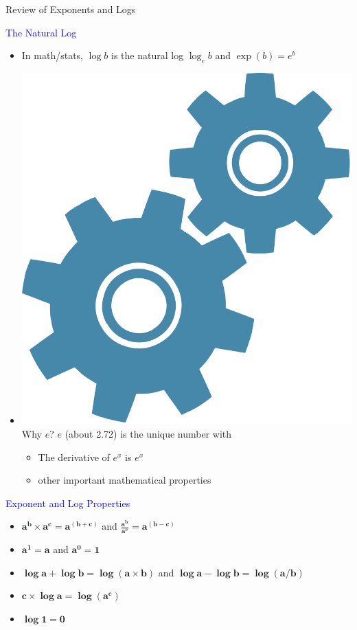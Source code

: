 \documentclass[10pt,t]{beamer}
\begin{document}
\begin{frame}{Review of Exponents and Logs}
	
	\vspace{-5 mm}
	
	\textcolor{blue}{The Natural Log}
	\begin{itemize}
		\item In math/stats, $\log b$ is the natural log $\log_e b$ and $\exp(b) = e^b$
		\medskip
		\item \includegraphics[scale = 0.01]{figures/technical} Why $e$? $e$ (about 2.72) is the unique number with
		\medskip
		\begin{itemize}
			\item The derivative of $e^x$ is $e^x$
			\medskip
			\item other important mathematical properties 
		\end{itemize}
	\end{itemize}
\medskip
\textcolor{blue}{Exponent and Log Properties}
\medskip
\begin{itemize}
	\item $\mathbf{a^b\times a^c = a^{(b+c)}}$ and $\mathbf{\frac{a^b}{a^c} = a^{(b-c)}}$
	\medskip
	\item $\mathbf{a^1 = a}$ and $\mathbf{a^0 = 1}$
	\medskip 
	\item $\mathbf{\log a +  \log b = \log(a\times b)}$ and $\mathbf{\log a - \log b = \log(a/b)}$
	\medskip
	\item $\mathbf{ c\times\log a = \log(a^c)}$
	\medskip
	\item $\mathbf{\log 1 = 0}$
\end{itemize}


\end{frame}
\end{document}
